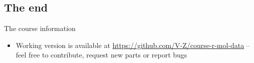 \documentclass[compress, ucs, xelatex, 11pt, xcolor=svgnames,
  hyperref={
    bookmarks=true,
    unicode=true,
    colorlinks=true,
    pdftitle={Molecular data in R},
    plainpages=false,
    pdfauthor={Vojtech Zeisek},
    pdfsubject={Course about phylogeny and evolution in R},
    pdfcreator={XeLaTeX},
    pdfkeywords={R, evolution, phylogeny, molecular data},
    linkcolor=Tomato,
    anchorcolor=SaddleBrown,
    citecolor=Goldenrod,
    filecolor=DarkMagenta,
    menucolor=Sienna,
    urlcolor=DarkTurquoise,
    pdftex},
  url={hyphens, lowtilde} %
  ]{beamer}
\begin{document}
\subsection{The end}

\begin{frame}{The course information}
  \begin{itemize}
    \item Working version is available at \url{https://github.com/V-Z/course-r-mol-data} -- feel free to contribute, request new parts or report bugs
  \end{itemize}
\end{frame}
\end{document}
